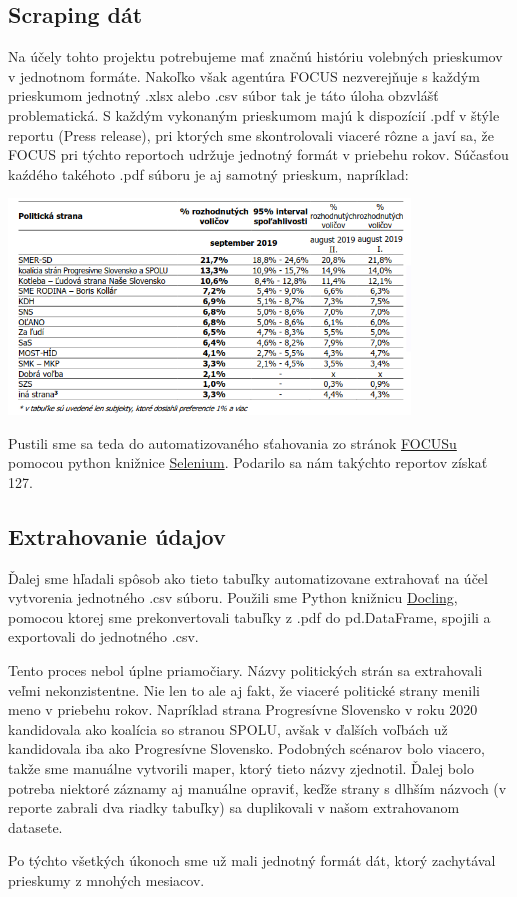 \documentclass[main.tex]{subfiles}
\begin{document}
	
\subsection{Scraping dát}
Na účely tohto projektu potrebujeme mať značnú históriu volebných prieskumov v jednotnom formáte.
Nakoľko však agentúra FOCUS nezverejňuje s každým prieskumom jednotný .xlsx alebo .csv súbor tak je táto úloha obzvlášť problematická.
S každým vykonaným prieskumom majú k dispozícií .pdf v štýle reportu (Press release), pri ktorých sme skontrolovali viaceré rôzne a javí sa, že FOCUS pri týchto reportoch udržuje jednotný formát v priebehu rokov.
Súčasťou kaźdého takéhoto .pdf súboru je aj samotný prieskum, napríklad:

\includegraphics[width=0.8\textwidth]{figs/priklad-focus-prieskumu.png}

Pustili sme sa teda do automatizovaného sťahovania zo stránok \href{https://www.focus-research.sk/}{FOCUSu} pomocou python knižnice \href{https://github.com/SeleniumHQ/Selenium}{Selenium}. 
Podarilo sa nám takýchto reportov získať 127.

\subsection{Extrahovanie údajov}
Ďalej sme hľadali spôsob ako tieto tabuľky automatizovane extrahovať na účel vytvorenia jednotného .csv súboru.
Použili sme Python knižnicu \href{https://github.com/DS4SD/docling}{Docling}, pomocou ktorej sme prekonvertovali tabuľky z .pdf do pd.DataFrame, spojili a exportovali do jednotného .csv.

Tento proces nebol úplne priamočiary. Názvy politických strán sa extrahovali veľmi nekonzistentne.
Nie len to ale aj fakt, že viaceré politické strany menili meno v priebehu rokov.
Napríklad strana Progresívne Slovensko v roku 2020 kandidovala ako koalícia so stranou SPOLU, avšak v ďalších voľbách už kandidovala iba ako Progresívne Slovensko.
Podobných scénarov bolo viacero, takže sme manuálne vytvorili maper, ktorý tieto názvy zjednotil.
Ďalej bolo potreba niektoré záznamy aj manuálne opraviť, keďže strany s dlhším názvoch (v reporte zabrali dva riadky tabuľky) sa duplikovali v našom extrahovanom datasete.

Po týchto všetkých úkonoch sme už mali jednotný formát dát, ktorý zachytával prieskumy z mnohých mesiacov.
\end{document}
